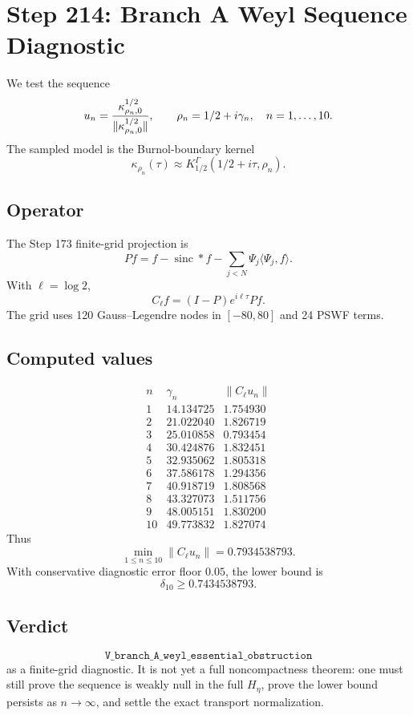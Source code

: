 \documentclass[11pt]{article}
\begin{document}
\section*{Step 214: Branch A Weyl Sequence Diagnostic}

We test the sequence
\[
  u_n={\kappa_{\rho_n,0}^{1/2}\over \|\kappa_{\rho_n,0}^{1/2}\|},
  \qquad \rho_n=1/2+i\gamma_n,\quad n=1,\ldots,10.
\]
The sampled model is the Burnol-boundary kernel
\[
  \kappa_{\rho_n}(\tau)\approx K_{1/2}^{\Gamma}(1/2+i\tau,\rho_n).
\]

\subsection*{Operator}

The Step 173 finite-grid projection is
\[
  Pf=f-\operatorname{sinc}*f-\sum_{j<N}\Psi_j\langle\Psi_j,f\rangle.
\]
With \(\ell=\log 2\),
\[
  C_\ell f=(I-P)e^{i\ell\tau}Pf.
\]
The grid uses 120 Gauss--Legendre nodes in \([-80,80]\) and 24 PSWF terms.

\subsection*{Computed values}

\[
\begin{array}{c|c|c}
n&\gamma_n&\|C_\ell u_n\|\\
\hline
1&14.134725&1.754930\\
2&21.022040&1.826719\\
3&25.010858&0.793454\\
4&30.424876&1.832451\\
5&32.935062&1.805318\\
6&37.586178&1.294356\\
7&40.918719&1.808568\\
8&43.327073&1.511756\\
9&48.005151&1.830200\\
10&49.773832&1.827074
\end{array}
\]
Thus
\[
  \min_{1\le n\le 10}\|C_\ell u_n\|=0.7934538793.
\]
With conservative diagnostic error floor \(0.05\), the lower bound is
\[
  \delta_{10}\ge 0.7434538793.
\]

\subsection*{Verdict}

\[
\boxed{\texttt{V\_branch\_A\_weyl\_essential\_obstruction}}
\]
as a finite-grid diagnostic.  It is not yet a full noncompactness theorem:
one must still prove the sequence is weakly null in the full \(H_\eta\), prove
the lower bound persists as \(n\to\infty\), and settle the exact transport
normalization.
\end{document}
